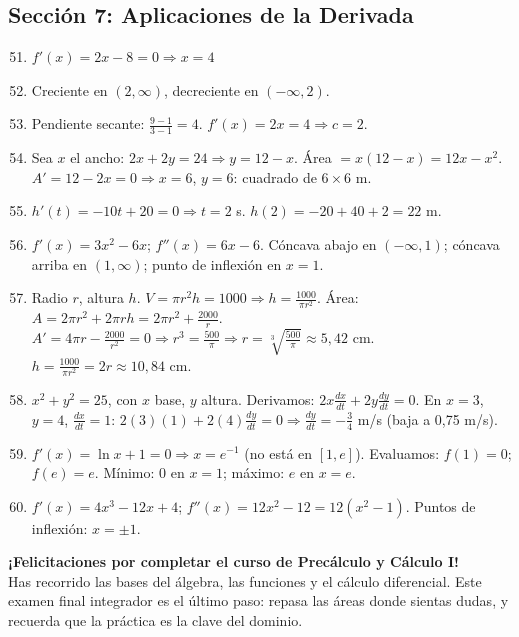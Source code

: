 \documentclass[12pt, a4paper]{article}
\begin{document}
\subsection*{Sección 7: Aplicaciones de la Derivada}

\begin{enumerate}[leftmargin=*, label=\textbf{\arabic*.}]
  \setcounter{enumi}{50}
  \item $f'(x) = 2x - 8 = 0 \Rightarrow x = 4$
  \item Creciente en $(2, \infty)$, decreciente en $(-\infty, 2)$.
  \item Pendiente secante: $\frac{9 - 1}{3 - 1} = 4$. $f'(x) = 2x = 4 \Rightarrow c = 2$.
  \item Sea $x$ el ancho: $2x + 2y = 24 \Rightarrow y = 12 - x$. Área $= x(12 - x) = 12x - x^2$. $A' = 12 - 2x = 0 \Rightarrow x = 6$, $y = 6$: cuadrado de $6 \times 6$ m.
  \item $h'(t) = -10t + 20 = 0 \Rightarrow t = 2$ s. $h(2) = -20 + 40 + 2 = 22$ m.
  \item $f'(x) = 3x^2 - 6x$; $f''(x) = 6x - 6$. Cóncava abajo en $(-\infty, 1)$; cóncava arriba en $(1, \infty)$; punto de inflexión en $x = 1$.
  \item Radio $r$, altura $h$. $V = \pi r^2 h = 1000 \Rightarrow h = \frac{1000}{\pi r^2}$. Área: $A = 2\pi r^2 + 2\pi r h = 2\pi r^2 + \frac{2000}{r}$. $A' = 4\pi r - \frac{2000}{r^2} = 0 \Rightarrow r^3 = \frac{500}{\pi} \Rightarrow r = \sqrt[3]{\frac{500}{\pi}} \approx 5{,}42$ cm. $h = \frac{1000}{\pi r^2} = 2r \approx 10{,}84$ cm.
  \item $x^2 + y^2 = 25$, con $x$ base, $y$ altura. Derivamos: $2x\frac{dx}{dt} + 2y\frac{dy}{dt} = 0$. En $x = 3$, $y = 4$, $\frac{dx}{dt} = 1$: $2(3)(1) + 2(4)\frac{dy}{dt} = 0 \Rightarrow \frac{dy}{dt} = -\frac{3}{4}$ m/s (baja a 0,75 m/s).
  \item $f'(x) = \ln x + 1 = 0 \Rightarrow x = e^{-1}$ (no está en $[1, e]$). Evaluamos: $f(1) = 0$; $f(e) = e$. Mínimo: $0$ en $x = 1$; máximo: $e$ en $x = e$.
  \item $f'(x) = 4x^3 - 12x + 4$; $f''(x) = 12x^2 - 12 = 12(x^2 - 1)$. Puntos de inflexión: $x = \pm 1$.
\end{enumerate}

\vspace{12pt}

\begin{cuadrosolucion}
  \textbf{¡Felicitaciones por completar el curso de Precálculo y Cálculo I!}\\
  Has recorrido las bases del álgebra, las funciones y el cálculo diferencial. Este examen final integrador es el último paso: repasa las áreas donde sientas dudas, y recuerda que la práctica es la clave del dominio.
\end{cuadrosolucion}
\end{document}
